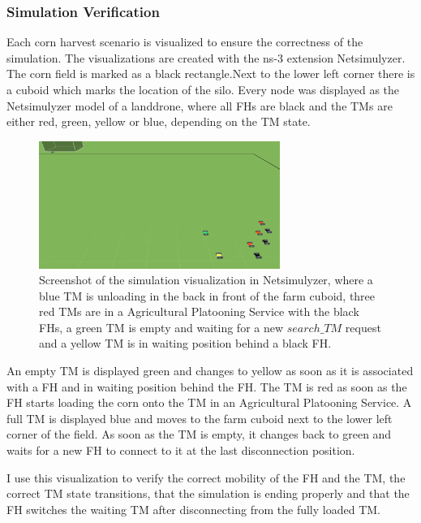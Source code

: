 \subsubsection*{Simulation Verification}
Each corn harvest scenario is visualized to ensure the correctness of the simulation.
The visualizations are created with the ns-3 extension Netsimulyzer.
The corn field is marked as a black rectangle.Next to the lower left corner there is a cuboid which marks the location of the silo.
Every node was displayed as the Netsimulyzer model of a landdrone, where all \ac{FH}s are black and the
\ac{TM}s are either red, green, yellow or blue, depending on the \ac{TM} state.
\begin{figure}[H]%
	\centering
	\includegraphics[width=0.7\textwidth]{figures/platooningScreen}
	\caption{Screenshot of the simulation visualization in Netsimulyzer, where a blue \ac{TM} is unloading in the back in front of the farm cuboid,
		three red \ac{TM}s are in a Agricultural Platooning Service with the black \ac{FH}s,
		a green \ac{TM} is empty and waiting for a new $search\_TM$ request and a yellow \ac{TM} is in waiting position behind a black \ac{FH}.}
	\label{fig:PlatooningScreenshot}%
\end{figure}

An empty \ac{TM} is displayed green and changes to yellow as soon as it is associated with a \ac{FH} and in waiting position behind the \ac{FH}.
The \ac{TM} is red as soon as the \ac{FH} starts loading the corn onto the \ac{TM} in an Agricultural Platooning Service.
A full \ac{TM} is displayed blue and moves to the farm cuboid next to the lower left corner of the field.
As soon as the \ac{TM} is empty, it changes back to green and waits for a new \ac{FH} to connect to it at the last disconnection position.

I use this visualization to verify the correct mobility of the \ac{FH} and the \ac{TM}, the correct \ac{TM} state transitions,
that the simulation is ending properly and that the \ac{FH} switches the waiting \ac{TM} after disconnecting
from the fully loaded \ac{TM}.

